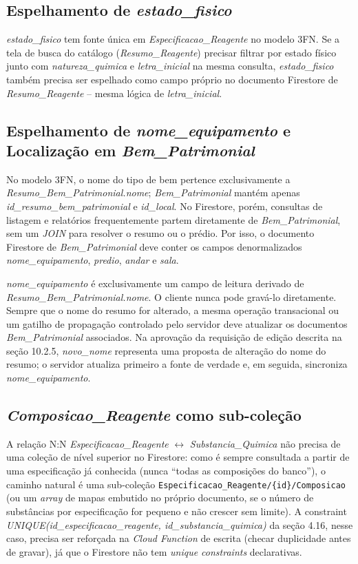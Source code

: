 \documentclass[12pt,a4paper]{article}
\begin{document}
\subsection{Espelhamento de \textit{estado\_fisico}}
\textit{estado\_fisico} tem fonte única em \textit{Especificacao\_Reagente} no modelo 3FN. Se a tela de busca do catálogo (\textit{Resumo\_Reagente}) precisar filtrar por estado físico junto com \textit{natureza\_quimica} e \textit{letra\_inicial} na mesma consulta, \textit{estado\_fisico} também precisa ser espelhado como campo próprio no documento Firestore de \textit{Resumo\_Reagente} -- mesma lógica de \textit{letra\_inicial}.

\subsection{Espelhamento de \textit{nome\_equipamento} e Localização em \textit{Bem\_Patrimonial}}
No modelo 3FN, o nome do tipo de bem pertence exclusivamente a \textit{Resumo\_Bem\_Patrimonial.nome}; \textit{Bem\_Patrimonial} mantém apenas \textit{id\_resumo\_bem\_patrimonial} e \textit{id\_local}. No Firestore, porém, consultas de listagem e relatórios frequentemente partem diretamente de \textit{Bem\_Patrimonial}, sem um \textit{JOIN} para resolver o resumo ou o prédio. Por isso, o documento Firestore de \textit{Bem\_Patrimonial} deve conter os campos denormalizados \textit{nome\_equipamento}, \textit{predio}, \textit{andar} e \textit{sala}.

\begin{regra}
\textit{nome\_equipamento} é exclusivamente um campo de leitura derivado de \textit{Resumo\_Bem\_Patrimonial.nome}. O cliente nunca pode gravá-lo diretamente. Sempre que o nome do resumo for alterado, a mesma operação transacional ou um gatilho de propagação controlado pelo servidor deve atualizar os documentos \textit{Bem\_Patrimonial} associados. Na aprovação da requisição de edição descrita na seção 10.2.5, \textit{novo\_nome} representa uma proposta de alteração do nome do resumo; o servidor atualiza primeiro a fonte de verdade e, em seguida, sincroniza \textit{nome\_equipamento}.
\end{regra}

\subsection{\textit{Composicao\_Reagente} como sub-coleção}
A relação N:N \textit{Especificacao\_Reagente} $\leftrightarrow$ \textit{Substancia\_Quimica} não precisa de uma coleção de nível superior no Firestore: como é sempre consultada a partir de uma especificação já conhecida (nunca ``todas as composições do banco''), o caminho natural é uma sub-coleção \texttt{Especificacao\_Reagente/\{id\}/Composicao} (ou um \textit{array} de mapas embutido no próprio documento, se o número de substâncias por especificação for pequeno e não crescer sem limite). A constraint \textit{UNIQUE(id\_especificacao\_reagente, id\_substancia\_quimica)} da seção 4.16, nesse caso, precisa ser reforçada na \textit{Cloud Function} de escrita (checar duplicidade antes de gravar), já que o Firestore não tem \textit{unique constraints} declarativas.
\end{document}
